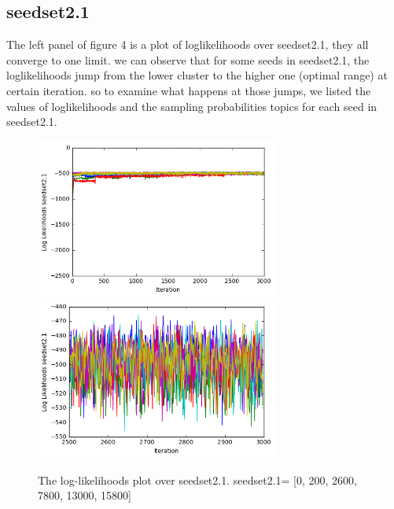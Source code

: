 \documentclass[11pt]{article}
\begin{document}
\begin{spacing}{1.6}
\subsection{seedset2.1}
\noindent The left panel of figure 4 is a plot of loglikelihoods over seedset2.1, they all converge to one limit. we can observe that for some seeds in seedset2.1, the loglikelihoods jump from the lower cluster to the higher one (optimal range) at certain iteration. so to examine what happens at those jumps, we listed the values of loglikelihoods and the sampling probabilities topics for each seed in seedset2.1.\\
\begin{minipage}{1.0\textwidth}
\begin{figure}[H]
\includegraphics[width = 80mm]{figure5.png}
\includegraphics[width = 80mm]{figure6.png}
\caption{The log-likelihoods plot over seedset2.1.  seedset2.1= [0, 200, 2600, 7800, 13000, 15800]}\scriptsize
\end{figure}
\end{minipage}\\





\end{spacing}
\end{document}
